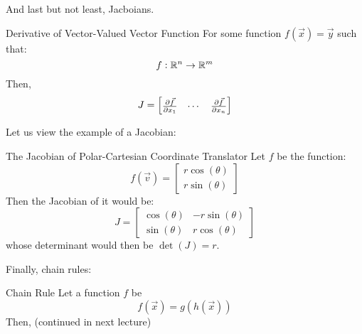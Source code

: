 And last but not least, Jacboians.
\begin{ln-define}{Derivative of Vector-Valued Vector Function}{}
    For some function $f(\vec{x}) = \vec{y}$ such that:
    \[
        f: \mathbb{R}^n \rightarrow \mathbb{R}^m
    \]
    Then,
    \[
        J = \begin{bmatrix} \pdv{\vec{f}}{x_1} & \cdots & \pdv{\vec{f}}{x_n} \end{bmatrix}
    \]
\end{ln-define}
Let us view the example of a Jacobian:
\begin{ln-explain}{The Jacobian of Polar-Cartesian Coordinate Translator}{}
    Let $f$ be the function:
    \[
        f(\vec{v}) = \begin{bmatrix} r \cos(\theta) \\ r \sin(\theta) \end{bmatrix}
    \]
    Then the Jacobian of it would be:
    \[
        J =
        \begin{bmatrix}
            \cos(\theta) & -r \sin(\theta) \\
            \sin(\theta) & r \cos(\theta)
        \end{bmatrix}
    \]
    whose determinant would then be $\det(J) = r$.
\end{ln-explain}
Finally, chain rules:
\begin{ln-define}{Chain Rule}{}
    Let a function $f$ be
    \[
        f(\vec{x}) = g(h(\vec{x}))
    \]
    Then, (continued in next lecture)
\end{ln-define}
